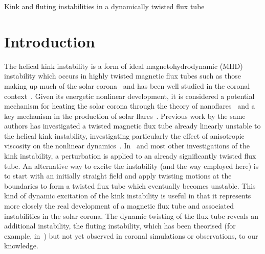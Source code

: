 \documentclass[12pt]{article}
\begin{document}

Kink and fluting instabilities in a dynamically twisted flux tube

\graphicspath{{images/kink_instability_straight/}}

\section{Introduction}

The helical kink instability is a form of ideal magnetohydrodynamic (MHD) instability which occurs in highly twisted magnetic flux tubes such as those making up much of the solar corona~\cite{realeCoronalLoopsObservations2014} and has been well studied in the coronal context~\cite{hoodKinkInstabilitySolar1979,hoodCoronalHeatingMagnetic2009,browningSolarCoronalHeating2003c,barefordShockHeatingNumerical2015,quinnEffectAnisotropicViscosity2020a}. Given its energetic nonlinear development, it is considered a potential mechanism for heating the solar corona through the theory of nanoflares~\cite{klimchukSolvingCoronalHeating2006a,browningMechanismsSolarCoronal1991} and a key mechanism in the production of solar flares~\cite{hoodKinkInstabilitySolar1979}. Previous work by the same authors has investigated a twisted magnetic flux tube already linearly unstable to the helical kink instability, investigating particularly the effect of anisotropic viscosity on the nonlinear dynamics~\cite{quinnEffectAnisotropicViscosity2020a}. In~\cite{quinnEffectAnisotropicViscosity2020a} and most other investigations of the kink instability, a perturbation is applied to an already significantly twisted flux tube. An alternative way to excite the instability (and the way employed here) is to start with an initially straight field and apply twisting motions at the boundaries to form a twisted flux tube which eventually becomes unstable. This kind of dynamic excitation of the kink instability is useful in that it represents more closely the real development of a magnetic flux tube and associated instabilities in the solar corona. The dynamic twisting of the flux tube reveals an additional instability, the fluting instability, which has been theorised (for example, in~\cite{priestMagnetohydrodynamicsSuna}) but not yet observed in coronal simulations or observations, to our knowledge. 
\end{document}

